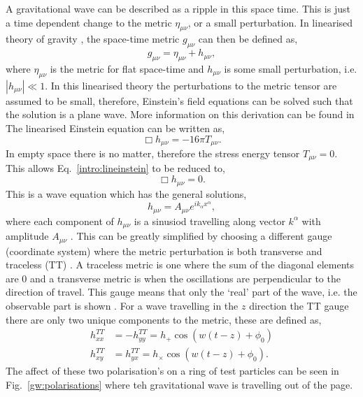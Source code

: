 A gravitational wave can be described as a ripple in this space time.
This is just a time dependent change to the metric $\eta_{\mu\nu}$, or a small perturbation.
In linearised theory of gravity \citep{}, the space-time metric $g_{\mu \nu}$ can then be defined as,
\begin{equation}
    g_{\mu \nu} = \eta_{\mu \nu} + h_{\mu \nu},
\end{equation}
where $ \eta_{\mu \nu}$ is the metric for flat space-time and $h_{\mu \nu}$ is some small perturbation, i.e. $|h_{\mu \nu}| \ll 1$. 
In this linearised theory the perturbations to the metric tensor are assumed to be small, therefore, Einstein's field equations can be solved such that the solution is a plane wave. 
More information on this derivation can be found in \citep{Flanagan2005TheTheory,}
The linearised Einstein equation can be written as,
\begin{equation}
\label{intro:lineinstein}
    \Box h_{\mu \nu} = -16 \pi T_{\mu\nu}.
\end{equation}
In empty space there is no matter, therefore the stress energy tensor $T_{\mu \nu} = 0$.
This allows Eq.~\ref{intro:lineinstein} to be reduced to, 
\begin{equation}
    \Box h_{\mu \nu} = 0.
\end{equation}
This is a wave equation which has the general solutions,
\begin{equation}
    h_{\mu\nu} = A_{\mu\nu}e^{ik_{\alpha} x^{\alpha}},
\end{equation}
where each component of $h_{\mu \nu}$ is a sinusiod travelling along vector $k^{\alpha}$ with amplitude $A_{\mu\nu}$ \citep{Capano2011SearchingData}.
This can be greatly simplified by choosing a different gauge (coordinate system) where the metric perturbation is both transverse and traceless (TT) \citep{}.
A traceless metric is one where the sum of the diagonal elements are 0 and a transverse metric is when the oscillations are perpendicular to the direction of travel. 
This gauge means that only the `real' part of the wave, i.e. the observable part is shown .
For a wave travelling in the $z$ direction the TT gauge there are only two unique components to the metric, these are defined as,
\begin{equation}
    \begin{split}
        h_{xx}^{TT} &= -h_{yy}^{TT} = h_{+} \cos{\left( w (t - z) + \phi_0\right)} \\
        h_{xy}^{TT} &= h_{yx}^{TT} = h_{\times} \cos{\left( w (t - z) + \phi_0\right)}.
    \end{split}
\end{equation}
The affect of these two polarisation's on a ring of test particles can be seen in Fig.~\ref{gw:polarisations} where teh gravitational wave is travelling out of the page.

